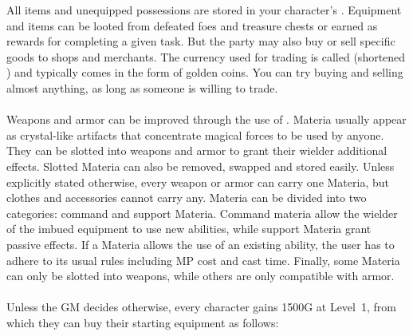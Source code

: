 %
\vfill
%
All items and unequipped possessions are stored in your character's .
Equipment and items can be looted from defeated foes and treasure chests or earned as rewards for completing a given task. 
But the party may also buy or sell specific goods to shops and merchants. 
The currency used for trading is called  (shortened ) and typically comes in the form of golden coins.
You can try buying and selling almost anything, as long as someone is willing to trade.
%
\newpage
%
%
\vfill
%
\\\\
%
Weapons and armor can be improved through the use of .
Materia usually appear as crystal-like artifacts that concentrate magical forces to be used by anyone.
They can be slotted into weapons and armor to grant their wielder additional effects.
Slotted Materia can also be removed, swapped and stored easily. 
Unless explicitly stated otherwise, every weapon or armor can carry one Materia, but clothes and accessories cannot carry any.
Materia can be divided into two categories: command and support Materia.
Command materia allow the wielder of the imbued equipment to use new abilities, while support Materia grant passive effects.
If a Materia allows the use of an existing ability, the user has to adhere to its usual rules including MP cost and cast time.
Finally, some Materia can only be slotted into weapons, while others are only compatible with armor.
%
\vfill
%
\\\\
%
Unless the GM decides otherwise, every character gains 1500G at Level~1, from which they can buy their starting equipment as follows:
\ofrow
{}
